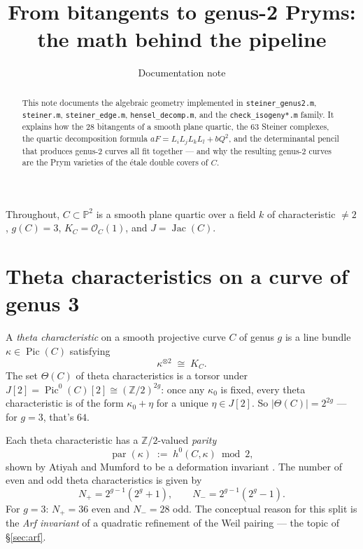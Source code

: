 \documentclass[11pt]{amsart}
\title{From bitangents to genus-2 Pryms:\\
the math behind the pipeline}
\author{Documentation note}
\date{}
\theoremstyle{plain}
\theoremstyle{definition}
\theoremstyle{remark}
\newcommand{\Pic}{\operatorname{Pic}}
\newcommand{\Jac}{\operatorname{Jac}}
\newcommand{\Parity}{\operatorname{par}}
\newcommand{\Pp}{\mathbb P}
\newcommand{\Z}{\mathbb Z}
\newcommand{\Oo}{\mathcal O}
\begin{document}
\maketitle

\begin{abstract}
This note documents the algebraic geometry implemented in
\texttt{steiner\_genus2.m}, \texttt{steiner.m}, \texttt{steiner\_edge.m},
\texttt{hensel\_decomp.m}, and the \texttt{check\_isogeny*.m} family. It
explains how the 28 bitangents of a smooth plane quartic, the 63 Steiner
complexes, the quartic decomposition formula
$aF = L_iL_jL_kL_l + bQ^2$, and the determinantal pencil that produces
genus-2 curves all fit together --- and why the resulting genus-2 curves
are the Prym varieties of the \'etale double covers of $C$.
\end{abstract}

Throughout, $C \subset \Pp^2$ is a smooth plane quartic over a field $k$ of
characteristic $\ne 2$, $g(C) = 3$, $K_C = \Oo_C(1)$, and $J = \Jac(C)$.

\section{Theta characteristics on a curve of genus 3}

A \emph{theta characteristic} on a smooth projective curve $C$ of genus $g$
is a line bundle $\kappa \in \Pic(C)$ satisfying
\[
  \kappa^{\otimes 2} \;\cong\; K_C.
\]
The set $\Theta(C)$ of theta characteristics is a torsor under
$J[2] = \Pic^0(C)[2] \cong (\Z/2)^{2g}$: once any $\kappa_0$ is fixed, every
theta characteristic is of the form $\kappa_0 + \eta$ for a unique
$\eta \in J[2]$. So $|\Theta(C)| = 2^{2g}$ --- for $g = 3$, that's $64$.

Each theta characteristic has a $\Z/2$-valued \emph{parity}
\[
  \Parity(\kappa) \;:=\; h^0(C, \kappa) \bmod 2,
\]
shown by Atiyah and Mumford to be a deformation invariant
\cite{Atiyah1971,Mumford1971}. The number of even and odd theta
characteristics is given by
\[
  N_+ = 2^{g-1}(2^g + 1), \qquad N_- = 2^{g-1}(2^g - 1).
\]
For $g = 3$: $N_+ = 36$ even and $N_- = 28$ odd. The conceptual reason for
this split is the \emph{Arf invariant} of a quadratic refinement of the Weil
pairing --- the topic of \S\ref{sec:arf}.

\end{document}
